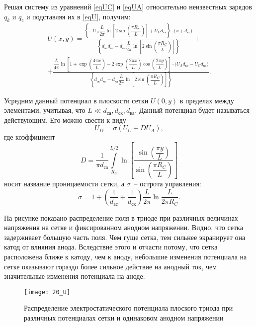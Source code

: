 Решая систему из уравнений \eqref{eqUC} и \eqref{eqUA} относительно неизвестных
зарядов \( q_k \) и \( q_c \) и подставляя их в \eqref{eqU}, получим:
\begin{gather*}
  U(x, y) = \frac{\left\{ -U_A \dfrac{L}{2\pi} \ln\left[ 2\sin\left(
    \dfrac{\pi R_C}{L} \right) \right] + U_C d_\text{са} \right\} \cdot
    \Big( x + d_\text{кс} \Big)}{\left\{ d_\text{ас} d_\text{кс} - d_\text{ка}
    \dfrac{L}{2\pi} \ln\left[ 2\sin\left( \dfrac{\pi R_C}{L}
    \right) \right] \right\}} + \\
  + \frac{\dfrac{L}{4\pi} \ln\left[ 1 + \exp\left( \dfrac{4\pi x}{L} \right) -
    2\exp\left( \dfrac{2\pi x}{L} \right) \cos\left( \dfrac{2\pi y}{L} \right)
    \right] \cdot \Big(U_A d_\text{кс} - U_C d_\text{ка} \Big)}{\left\{
    d_\text{ас} d_\text{кс} - d_\text{ка} \dfrac{L}{2\pi} \ln\left[
    2\sin\left( \dfrac{\pi R_C}{L} \right) \right] \right\}}.
\end{gather*}

Усредним данный потенциал в плоскости сетки \( U(0, y) \) в пределах между
элементами, учитывая, что \( L \ll d_\text{са}, d_\text{ск}, d_\text{ка} \).
Данный потенциал будет называться действующим. Его можно свести к виду
\begin{equation}
  U_D = \sigma (U_C + D U_A),
  \label{eqUD}
\end{equation}
где коэффициент
\[
  D = \frac{1}{\pi d_\text{са}} \int\limits_{R_C}^{L / 2} \ln\left[
    \frac{\sin\left( \dfrac{\pi y}{L} \right)}{\sin\left( \dfrac{\pi R_C}{L}
    \right)} \right]
\]
носит название проницаемости сетки, а \( \sigma \)~-- острота управления:
\[
  \sigma = 1 + \left( \frac{1}{d_\text{ас}} + \frac{1}{d_\text{ск}} \right)
    \frac{L}{2\pi} \ln\frac{L}{2\pi R_C}.
\]

На рисунке  показано распределение поля в триоде при различных
величинах напряжения на сетке и фиксированном анодном напряжении. Видно, что
сетка задерживает большую часть поля. Чем гуще сетка, тем сильнее экранирует
она катод от влияния анода. Вследствие этого и отчасти потому, что сетка
расположена ближе к катоду, чем к аноду, небольшие изменения потенциала на
сетке оказывают гораздо более сильное действие на анодный ток, чем значительные
изменения потенциала на аноде.

\begin{figure}[hb!]
  \center
  \texttt{[image: 20\_U]}
  \caption{Распределение электростатического потенциала плоского триода при
  различных потенциалах сетки и одинаковом анодном напряжении}
  \label{pic20U}
\end{figure}
